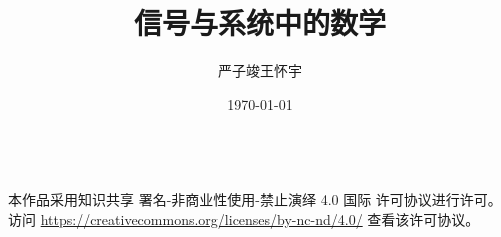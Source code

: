 \documentclass{ctexbook}
\title{信号与系统中的数学}
\author{严子竣\quad 王怀宇}
\date{\today}
\begin{document}
\frontmatter%



\vfill 

\begin{center}
    {\huge\ccbyncnd} \\[1em]
    {\large 本作品采用知识共享 署名-非商业性使用-禁止演绎 4.0 国际 许可协议进行许可。} \\
    {\small 访问 \url{https://creativecommons.org/licenses/by-nc-nd/4.0/} 查看该许可协议。}
\end{center}

\newpage
\renewcommand{\contentsname}{简要目录}
\tableofcontents

\clearpage

\renewcommand{\contentsname}{详尽目录}
\setcounter{tocdepth}{2}
\tableofcontents%
\mainmatter%



















\printbibliography[heading=bibintoc, title={参考文献}]
\end{document}

